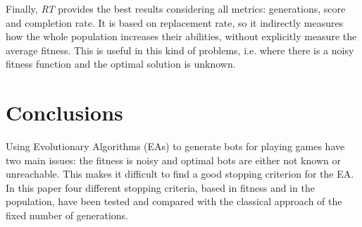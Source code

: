 \documentclass[runningheads,a4paper]{llncs}
\begin{document}
Finally, \textit{RT} provides the best results considering all metrics: generations, score and completion rate. It is based on replacement rate, so it indirectly measures how the whole population increases their abilities, without explicitly measure the average fitness. This is useful in this kind of problems, i.e. where there is a noisy fitness function and the optimal solution is unknown.



%
\section{Conclusions}




Using Evolutionary Algorithms (EAs) to generate bots for playing games have two main issues: the fitness is noisy and optimal bots are either not known or unreachable. This makes it difficult to find a good stopping criterion for the EA. In this paper four different stopping criteria, based in fitness and in the population, have been tested and compared with the classical approach of the fixed number of generations. 
\end{document}
